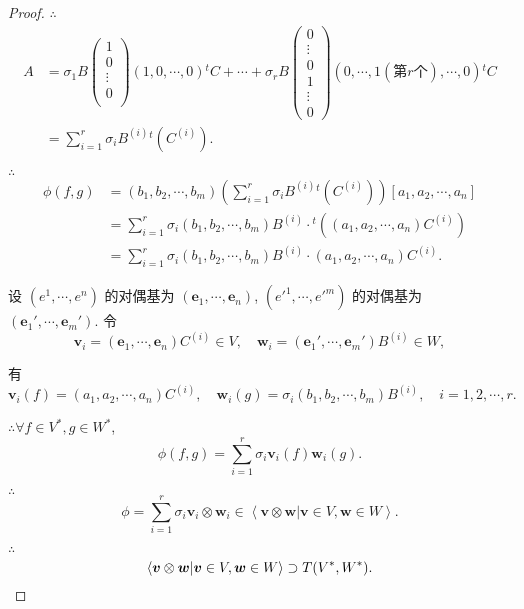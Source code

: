 \documentclass{ctexart}
\begin{document}
\begin{proof}
    $\therefore$
    \begin{align*}
        A & =\sigma_1B\begin{pmatrix}
            1 \\
            0 \\
            \vdots \\
            0 \\
        \end{pmatrix}(1,0,\cdots,0){}^tC+\cdots+\sigma_rB\begin{pmatrix}
            0 \\
            \vdots \\
            0 \\
            1 \\
            \vdots \\
            0
        \end{pmatrix}(0,\cdots,1(\text{第}r\text{个}),\cdots,0){}^tC \\
        & =\sum\limits_{i=1}^r\sigma_iB^{(i)}{}^t(C^{(i)}).
    \end{align*}

    $\therefore$
    \begin{align*}
        \phi(f,g) & =(b_1,b_2,\cdots,b_m)\left(\sum\limits_{i=1}^r\sigma_iB^{(i)}{}^t(C^{(i)})\right)[a_1,a_2,\cdots,a_n] \\
        & =\sum\limits_{i=1}^r\sigma_i(b_1,b_2,\cdots,b_m)B^{(i)}\cdot{}^t((a_1,a_2,\cdots,a_n)C^{(i)}) \\
        & =\sum\limits_{i=1}^r\sigma_i(b_1,b_2,\cdots,b_m)B^{(i)}\cdot(a_1,a_2,\cdots,a_n)C^{(i)}.
    \end{align*}

    设 $(e^1,\cdots,e^n)$ 的对偶基为 $(\boldsymbol{e}_1,\cdots,\boldsymbol{e}_n)$, $(e'^1,\cdots,e'^m)$ 的对偶基为 $(\boldsymbol{e}_1',\cdots,\boldsymbol{e}_m')$. 令
    \[\boldsymbol{v}_i=(\boldsymbol{e}_1,\cdots,\boldsymbol{e}_n)C^{(i)}\in V,\quad\boldsymbol{w}_i=(\boldsymbol{e}_1',\cdots,\boldsymbol{e}_m')B^{(i)}\in W,\]
    
    有
    \[\boldsymbol{v}_i(f)=(a_1,a_2,\cdots,a_n)C^{(i)},\quad\boldsymbol{w}_i(g)=\sigma_i(b_1,b_2,\cdots,b_m)B^{(i)},\quad i=1,2,\cdots,r.\]

    $\therefore\forall f\in V^*,g\in W^*$,
    \[\phi(f,g)=\sum\limits_{i=1}^r\sigma_i\boldsymbol{v}_i(f)\boldsymbol{w}_i(g).\]

    $\therefore$
    \[\phi=\sum\limits_{i=1}^r\sigma_i\boldsymbol{v}_i\otimes\boldsymbol{w}_i\in\left<\boldsymbol{v}\otimes\boldsymbol{w}|\boldsymbol{v}\in V,\boldsymbol{w}\in W\right>.\]

    $\therefore$
    \[\left<\boldsymbol{v}\otimes\boldsymbol{w}|\boldsymbol{v}\in V,\boldsymbol{w}\in W\right>\supset T(V^*,W^*).\qedhere\]
\end{proof}
\end{document}
